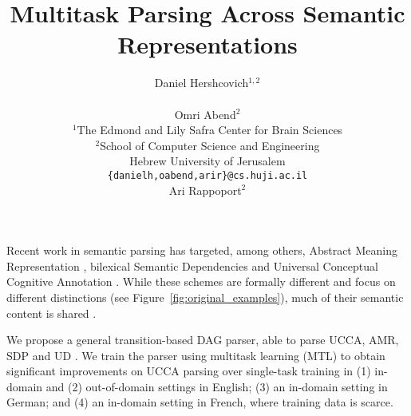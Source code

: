 \documentclass[11pt,a4paper]{article}
\title{Multitask Parsing Across Semantic Representations}
\author{Daniel Hershcovich$^{1,2}$ \\
  \\\And
  Omri Abend$^2$ \\
  $^1$The Edmond and Lily Safra Center for Brain Sciences \\
  $^2$School of Computer Science and Engineering \\
  Hebrew University of Jerusalem \\
  \texttt{\{danielh,oabend,arir\}@cs.huji.ac.il}
  \\\And
  Ari Rappoport$^2$
}
\date{}
\begin{document}
\maketitle

Recent work in semantic parsing has targeted, among others,
Abstract Meaning Representation \cite[AMR;][]{banarescu2013abstract},
bilexical Semantic Dependencies \cite[SDP;][]{oepen2016towards}
and Universal Conceptual Cognitive Annotation \cite[UCCA;][]{abend2013universal}.
While these schemes are formally different and focus on different distinctions
(see Figure~\ref{fig:original_examples}),
much of their semantic content is shared \cite{abend2017state}.

We propose a general transition-based DAG parser,
able to parse UCCA, AMR, SDP and UD \cite{nivre2016universal}.
We train the parser using multitask learning (MTL)
to obtain significant improvements
on UCCA parsing over single-task training in
(1) in-domain and (2) out-of-domain settings in English;
(3) an in-domain setting in German; and
(4) an in-domain setting in French, where training data is
scarce.
\end{document}
